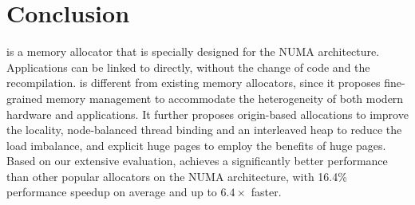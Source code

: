 \section{Conclusion}
\label{sec:conclusion}

\NM{} is a memory allocator that is specially designed for the NUMA architecture. Applications can be linked to \NM{} directly, without the change of code and the recompilation. \NM{} is different from existing memory allocators, since it proposes fine-grained memory management to accommodate the heterogeneity of both modern hardware and applications. It further proposes origin-based allocations to improve the locality, node-balanced thread binding and an interleaved heap to reduce the load imbalance, and explicit huge pages to employ the benefits of huge pages. 
Based on our extensive evaluation, \NM{} achieves a significantly better performance than other popular allocators on the NUMA architecture, with 16.4\% performance speedup on average and up to $6.4\times$ faster.
